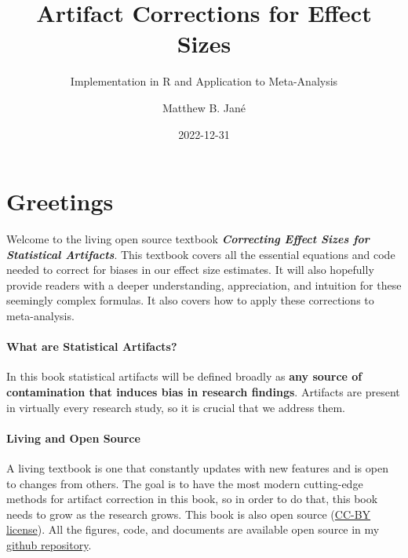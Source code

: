 \documentclass[
  letterpaper,
  DIV=11,
  numbers=noendperiod]{scrreprt}
\title{Artifact Corrections for Effect Sizes}
\subtitle{Implementation in R and Application to Meta-Analysis}
\author{Matthew B. Jané}
\date{2022-12-31}
\renewcommand*\contentsname{Table of contents}
\newcommand\contentsname{Table of contents}
\begin{document}
\maketitle
\ifdefined\Shaded\renewenvironment{Shaded}{\begin{tcolorbox}[boxrule=0pt, interior hidden, frame hidden, breakable, enhanced, sharp corners, borderline west={3pt}{0pt}{shadecolor}]}{\end{tcolorbox}}\fi

\renewcommand*\contentsname{Table of contents}
{
\hypersetup{linkcolor=}
\setcounter{tocdepth}{2}
\tableofcontents
}

\hypertarget{greetings}{%
\chapter{Greetings}\label{greetings}}

Welcome to the living open source textbook \textbf{\emph{Correcting
Effect Sizes for Statistical Artifacts}}. This textbook covers all the
essential equations and code needed to correct for biases in our effect
size estimates. It will also hopefully provide readers with a deeper
understanding, appreciation, and intuition for these seemingly complex
formulas. It also covers how to apply these corrections to
meta-analysis.

\hypertarget{what-are-statistical-artifacts}{%
\subsubsection*{What are Statistical
Artifacts?}\label{what-are-statistical-artifacts}}

In this book statistical artifacts will be defined broadly as
\textbf{any source of contamination that induces bias in research
findings}. Artifacts are present in virtually every research study, so
it is crucial that we address them.

\hypertarget{living-and-open-source}{%
\subsubsection*{Living and Open Source}\label{living-and-open-source}}

A living textbook is one that constantly updates with new features and
is open to changes from others. The goal is to have the most modern
cutting-edge methods for artifact correction in this book, so in order
to do that, this book needs to grow as the research grows. This book is
also open source (\href{LICENSE}{CC-BY license}). All the figures, code,
and documents are available open source in my
\href{https://github.com/MatthewBJane/artifact-corrections-for-effect-sizes/tree/gh-pages}{github
repository}.
\end{document}
